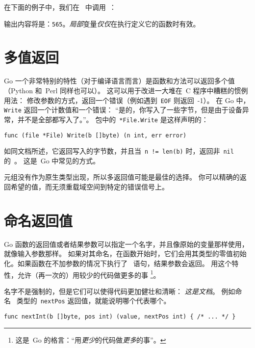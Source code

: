在下面的例子中，我们在~ 中调用~：



输出内容将是：\texttt{565}。\emph{局部}变量\emph{仅仅}在执行定义它的函数时有效。

\section{多值返回}
\label{sec:multiple return}
Go 一个非常特别的特性（对于编译语言而言）是函数和方法可以返回多个值（Python 和~Perl 同样也可以）。
这可以用于改进一大堆在~C 程序中糟糕的惯例用法：
修改参数的方式，返回一个错误（例如遇到~\texttt{EOF} 则返回~-1）。
在 Go 中，\lstinline{Write} 返回一个计数值和一个错误：
``是的，你写入了一些字节，但是由于设备异常，并不是全部都写入了。''。
 包中的~\lstinline{*File.Write} 是这样声明的：
\begin{lstlisting}
func (file *File) Write(b []byte) (n int, err error)
\end{lstlisting}
如同文档所述，它返回写入的字节数，并且当~\lstinline{n != len(b)} 时，返回非~\lstinline{nil} 的~。
这是~Go 中常见的方式。

元组没有作为原生类型出现，所以多返回值可能是最佳的选择。
你可以精确的返回希望的值，而无须重载域空间到特定的错误信号上。

\section{命名返回值}
\label{sec:named result parameters}
Go 函数的返回值或者结果参数可以指定一个名字，并且像原始的变量那样使用，就像输入参数那样。
如果对其命名，在函数开始时，它们会用其类型的零值初始化。如果函数在不加参数的情况下执行了~
 语句，结果参数会返回。
用这个特性，允许（再一次的）用较少的代码做更多的事
\footnote{这是~Go 的格言：``用\emph{更少}的代码做\emph{更多}的事''。}。

名字不是强制的，但是它们可以使得代码更加健壮和清晰：
\emph{这是文档}。
例如命名~ 类型的~\lstinline{nextPos} 返回值，就能说明哪个代表哪个。
\begin{lstlisting}
func nextInt(b []byte, pos int) (value, nextPos int) { /* ... */ }
\end{lstlisting}

